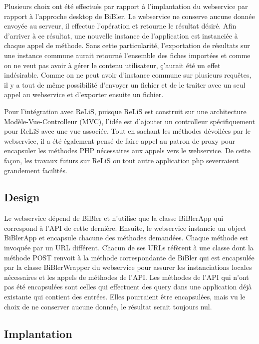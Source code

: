 \documentclass[a4paper,12pt,titlepage]{article}
\begin{document}
Plusieurs choix ont été effectués par rapport à l'implantation du webservice par rapport à l'approche desktop de BiBler. Le webservice ne conserve aucune donnée envoyée au serveur, il effectue l'opération et retourne le résultat désiré. Afin d'arriver à ce résultat, une nouvelle instance de l'application est instanciée à chaque appel de méthode. Sans cette particularité, l'exportation de résultats sur une instance commune aurait retourné l'ensemble des fiches importées et comme on ne veut pas avoir à gérer le contenu utilisateur, ç'aurait été un effet indésirable. Comme on ne peut avoir d'instance commune sur plusieurs requêtes, il y a tout de même possibilité d'envoyer un fichier et de le traiter avec un seul appel au webservice et d'exporter ensuite un fichier.\newline

Pour l'intégration avec ReLiS, puisque ReLiS est construit sur une architecture Modèle-Vue-Controlleur (MVC), l'idée est d'ajouter un controlleur spécifiquement pour ReLiS avec une vue associée. Tout en sachant les méthodes dévoilées par le webservice, il a été également pensé de faire appel au patron de proxy pour encapsuler les méthodes PHP nécessaires aux appels vers le webservice. De cette façon, les travaux futurs sur ReLiS ou tout autre application php severraient grandement facilités.


\subsection{Design}
Le webservice dépend de BiBler et n'utilise que la classe BiBlerApp qui correspond à l'API de cette dernière. Ensuite, le webservice instancie un object BiBlerApp et encapsule chacune des méthodes demandées. Chaque méthode est invoquée par un URL différent. Chacun de ses URLs réfèrent à une classe dont la méthode POST renvoit à la méthode correspondante de BiBler qui est encapsulée par la classe BiBlerWrapper du webservice pour assurer les instanciations locales nécessaires et les appels de méthodes de l'API. Les méthodes de l'API qui n'ont pas été encapsulées sont celles qui effectuent des query dans une application déjà existante qui contient des entrées. Elles pourraient être encapsulées, mais vu le choix de ne conserver aucune donnée, le résultat serait toujours nul. \newline
\subsection{Implantation}
\end{document}
